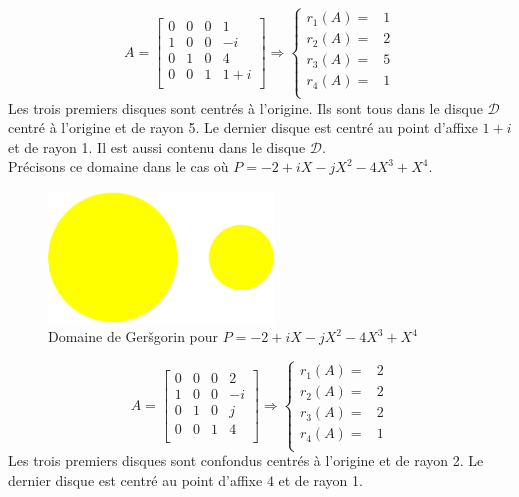\begin{enumerate}
\begin{displaymath}
 A=
\begin{bmatrix}
 0 & 0 & 0 &  1 \\
 1 & 0 & 0 &  -i \\
 0 & 1 & 0 &  4 \\
 0 & 0 & 1 &  1+i \\
\end{bmatrix}
\Rightarrow
\left\lbrace 
\begin{aligned}
 r_1(A) =& 1 \\
 r_2(A) =& 2 \\
 r_3(A) =& 5 \\
 r_4(A) =& 1 \\
\end{aligned}
\right. 
\end{displaymath}
Les trois premiers disques sont centrés à l'origine. Ils sont tous dans le disque $\mathcal D$ centré à l'origine et de rayon 5. Le dernier disque est centré au point d'affixe $1+i$ et de rayon 1. Il est aussi contenu dans le disque $\mathcal D$.\\
Précisons ce domaine dans le cas où $P=-2+iX-jX^2-4X^3+X^4$.
\begin{figure}
 \centering
 \includegraphics[width=6cm]{Cgersg_2.pdf}
 \caption{Domaine de Ger\v{s}gorin pour $P=-2+iX-jX^2-4X^3+X^4$}
 \label{fig: Cgersg_2}
\end{figure}

\begin{displaymath}
 A=
\begin{bmatrix}
 0 & 0 & 0 &  2 \\
 1 & 0 & 0 &  -i \\
 0 & 1 & 0 &  j \\
 0 & 0 & 1 &  4 \\
\end{bmatrix}
\Rightarrow
\left\lbrace 
\begin{aligned}
 r_1(A) =& 2 \\
 r_2(A) =& 2 \\
 r_3(A) =& 2 \\
 r_4(A) =& 1 \\
\end{aligned}
\right. 
\end{displaymath}
Les trois premiers disques sont confondus centrés à l'origine et de rayon 2. Le dernier disque est centré au point d'affixe $4$ et de rayon 1.
\end{enumerate}

